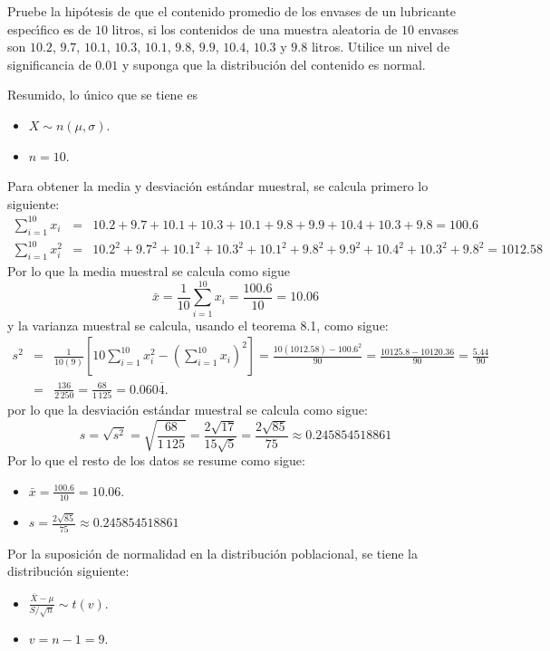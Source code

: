 \begin{enunciado}
 Pruebe la hip\'otesis de que el contenido promedio de los envases de un lubricante espec\'{\i}fico es de $10$ litros, si los contenidos de una muestra aleatoria de $10$ envases son $10.2$, $9.7$, $10.1$, $10.3$, $10.1$, $9.8$, $9.9$, $10.4$, $10.3$ y $9.8$ litros. Utilice un nivel de significancia de $0.01$ y suponga que la distribuci\'on del contenido es normal.
\end{enunciado}

\begin{solucion}
 \begin{datos}
  Resumido, lo \'unico que se tiene es
  \begin{itemize}
   \item $X \sim n(\mu, \sigma)$.
   \item $n = 10$.
  \end{itemize}
  Para obtener la media y desviaci\'on est\'andar muestral, se calcula primero lo siguiente:
  \begin{eqnarray*}
   \sum_{i=1}^{10} x_i & = & 10.2 + 9.7 + 10.1 + 10.3 + 10.1 + 9.8 + 9.9 + 10.4 + 10.3 + 9.8 = 100.6 \\
   \sum_{i=1}^{10} x_i^2 & = & 10.2^2 + 9.7^2 + 10.1^2 + 10.3^2 + 10.1^2 + 9.8^2 + 9.9^2 + 10.4^2 + 10.3^2 + 9.8^2 = 1012.58
  \end{eqnarray*}
  Por lo que la media muestral se calcula como sigue
  \begin{equation*}
   \bar{x} = \frac{1}{10} \sum_{i=1}^{10} x_i = \frac{100.6}{10} = 10.06
  \end{equation*}
  y la varianza muestral se calcula, usando el teorema 8.1, como sigue:
  \begin{eqnarray*}
   s^2 & = & \frac{1}{10(9)} \left[ 10\sum_{i=1}^{10} x_i^2 - \left( \sum_{i=1}^{10} x_i \right)^2 \right] = \frac{10(1012.58) - 100.6^2}{90} = \frac{10125.8 - 10120.36}{90} = \frac{5.44}{90} \\
   & = & \frac{136}{2\,250} = \frac{68}{1\,125} = 0.060\overline{4}.
  \end{eqnarray*}
  por lo que la desviaci\'on est\'andar muestral se calcula como sigue:
  \begin{equation*}
   s = \sqrt{s^2} = \sqrt{\frac{68}{1\,125}} = \frac{2\sqrt{17}}{15\sqrt{5}} = \frac{2\sqrt{85}}{75} \approx 0.245854518861
  \end{equation*}
  Por lo que el resto de los datos se resume como sigue:
  \begin{itemize}
   \item $\bar{x} = \frac{100.6}{10} = 10.06$.
   \item $s = \frac{2\sqrt{85}}{75} \approx 0.245854518861$
  \end{itemize}
  Por la suposici\'on de normalidad en la distribuci\'on
  poblacional, se tiene la distribuci\'on siguiente:
  \begin{itemize}
   \item $\displaystyle{\frac{\overline{X} - \mu}{S/\sqrt{n}}  \sim t(v) }$.
   \item $v = n-1 = 9$.
  \end{itemize}
 \end{datos}


\end{solucion}

